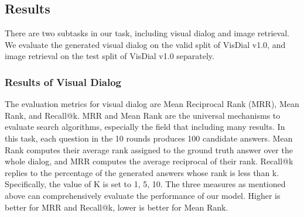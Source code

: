 \documentclass[review]{elsarticle}
\begin{document}
	\subsection{Results}
	There are two subtasks in our task, including visual dialog and image retrieval. We evaluate the generated visual dialog on the valid split of VisDial v1.0, and image retrieval on the test split of VisDial v1.0 separately. 
	
	\subsubsection{Results of Visual Dialog}
	The evaluation metrics for visual dialog are Mean Reciprocal Rank (MRR), Mean Rank, and Recall@k. MRR and Mean Rank are the universal mechanisms to evaluate search algorithms, especially the field that including many results. 
	In this task, each question in the 10 rounds produces 100 candidate answers. Mean Rank computes their average rank assigned to the ground truth answer over the whole dialog, and MRR computes the average reciprocal of their rank. Recall@k replies to the percentage of the generated answers whose rank is less than k. 
	Specifically, the value of K is set to 1, 5, 10. The three measures as mentioned above can comprehensively evaluate the performance of our model. Higher is better for MRR and Recall@k, lower is better for Mean Rank.
	
\end{document}
